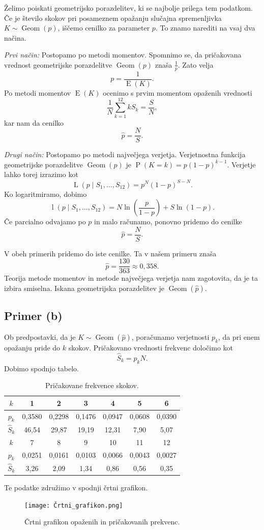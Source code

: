 \documentclass[a4paper,11pt]{article}
\DeclareMathOperator{\E}{E}
\DeclareMathOperator{\PP}{P}
\DeclareMathOperator{\Geom}{Geom}
\DeclareMathOperator{\Lver}{L}
\DeclareMathOperator{\lver}{l}
\begin{document}
Želimo poiskati geometrijsko porazdelitev, ki se najbolje prilega tem podatkom. 
Če je število skokov pri posameznem opažanju slučajna spremenljivka $K \sim \Geom(p)$, 
iščemo cenilko za parameter $p$. To znamo narediti na vsaj dva načina.

\emph{Prvi način:} Postopamo po metodi momentov. 
Spomnimo se, da pričakovana vrednost geometrijske porazdelitve $\Geom(p)$ znaša $\frac{1}{p}$.
Zato velja
\[p = \frac{1}{\E(K)}.\]
Po metodi momentov $\E(K)$ ocenimo s prvim momentom opaženih vrednosti 
\[\frac{1}{N} \sum_{k=1}^{12} k S_k = \frac{S}{N},\]
kar nam da cenilko
\[\hat{p} = \frac{N}{S}.\]

\emph{Drugi način:} Postopamo po metodi največjega verjetja.
Verjetnostna funkcija geometrijske porazdelitve $\Geom(p)$ je $\PP(K=k) = p(1-p)^{k-1}$.
Verjetje lahko torej izrazimo kot 
\[\Lver(p \mid S_1, \ldots, S_{12}) = p^N (1-p)^{S - N}.\]
Ko logaritmiramo, dobimo 
\[\lver(p \mid S_1, \ldots, S_{12}) = N \ln(\frac{p}{1-p}) + S \ln(1-p).\]
Če parcialno odvajamo po $p$ in malo računamo, ponovno pridemo do cenilke
\[\hat{p} = \frac{N}{S}.\]

V obeh primerih pridemo do iste cenilke.
Ta v našem primeru znaša 
\[\hat{p} = \frac{130}{363} \approx 0,358.\]
Teorija metode momentov in metode največjega verjetja nam zagotovita, da je ta izbira smiselna.
Iskana geometrijska porazdelitev je $\Geom(\hat{p})$.

\subsection*{Primer (b)}

Ob predpostavki, da je $K \sim \Geom(\hat{p})$, poračunamo verjetnosti $p_k$, da pri enem opažanju pride do $k$ skokov.
Pričakovano vrednosti frekvenc določimo kot
\[\hat{S}_k = p_k N.\]
Dobimo spodnjo tabelo.
\begin{table}[H]
    \centering
    \begin{tabular}{|c|c|c|c|c|c|c|}
    \hline
    $k$ & 1 & 2 & 3 & 4 & 5 & 6 \\ \hline
    $p_k$ & 0,3580 & 0,2298 & 0,1476 & 0,0947 & 0,0608 & 0,0390  \\ \hline
    $\hat{S}_k$ & 46,54 & 29,87 & 19,19 & 12,31 & 7,90 & 5,07 \\ \hline
    $k$ & 7 & 8 & 9 & 10 & 11 & 12 \\ \hline
    $p_k$ & 0,0251 & 0,0161 & 0,0103 & 0,0066 & 0,0043 & 0,0027 \\ \hline
    $\hat{S}_k$ & 3,26 & 2,09 & 1,34 & 0,86 & 0,56 & 0,35 \\ \hline
\end{tabular}
\caption{Pričakovane frekvence skokov.}
\label{PricakovaneFreq}
\end{table}
Te podatke združimo v spodnji črtni grafikon.
\begin{figure}[H]
    \centering
    \texttt{[image: Črtni\_grafikon.png]}
    \caption{Črtni grafikon opaženih in pričakovanih prekvenc.}
\end{figure}
\end{document}
